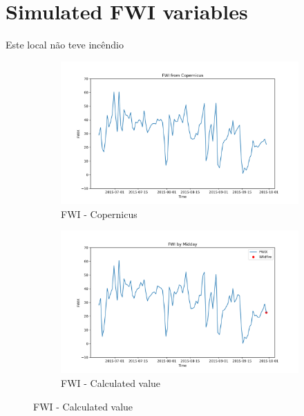\section{Simulated FWI variables}
Este local não teve incêndio
\begin{figure}[h]
\caption{Comparison of FWI calculated values and Copernicus}
    \centering
    \begin{subfigure}{0.49\textwidth}
        \centering
        \includegraphics[width=\textwidth]{graphs/2015MesmoSitio/2015CopernicusFWI12.png}
        \caption{FWI - Copernicus}
        \label{fig:fwi_copernicus_2015_semfogo}
    \end{subfigure}
    \hfill
    \begin{subfigure}{0.49\textwidth}
        \centering
        \includegraphics[width=\textwidth]{graphs/2015MesmoSitio/2015CalcFWI12.png}
        \caption{FWI - Calculated value}
        \label{fig:fwi_calculated_2015_semfogo}
    \end{subfigure}
    \label{fig:comparison_semfogo_copernicus_calculated}
\end{figure}

